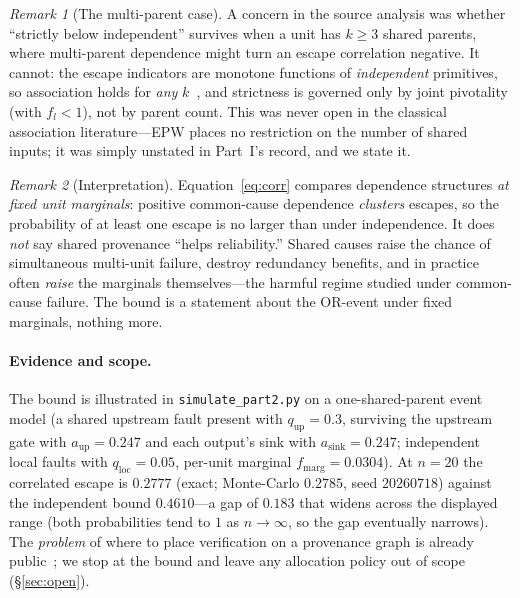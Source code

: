 \documentclass[11pt]{article}
\theoremstyle{definition}
\theoremstyle{remark}
\newtheorem{remark}{Remark}
\newcommand{\fesc}{f}
\begin{document}
\begin{remark}[The multi-parent case]
A concern in the source analysis was whether ``strictly below independent'' survives when a unit has
$k\ge3$ shared parents, where multi-parent dependence might turn an escape correlation negative.
It cannot: the escape indicators are monotone functions of \emph{independent} primitives, so
association holds for \emph{any} $k$~\cite{esary1967}, and strictness is governed only by joint
pivotality (with $\fesc_l<1$), not by parent count. This was never open in the classical association
literature---EPW places no restriction on the number of shared inputs; it was simply unstated in
Part~I's record, and we state it.
\end{remark}

\begin{remark}[Interpretation]\label{rem:interp}
Equation~\eqref{eq:corr} compares dependence structures \emph{at fixed unit marginals}: positive
common-cause dependence \emph{clusters} escapes, so the probability of at least one escape is no larger
than under independence. It does \emph{not} say shared provenance ``helps reliability.'' Shared causes
raise the chance of simultaneous multi-unit failure, destroy redundancy benefits, and in practice often
\emph{raise} the marginals themselves---the harmful regime studied under common-cause failure. The
bound is a statement about the OR-event under fixed marginals, nothing more.
\end{remark}

\paragraph{Evidence and scope.}
The bound is illustrated in \texttt{simulate\_part2.py} on a one-shared-parent event model (a shared
upstream fault present with $q_{\mathrm{up}}=0.3$, surviving the upstream gate with $a_{\mathrm{up}}=0.247$
and each output's sink with $a_{\mathrm{sink}}=0.247$; independent local faults with $q_{\mathrm{loc}}=0.05$,
per-unit marginal $\fesc_{\mathrm{marg}}=0.0304$). At $n=20$ the correlated escape is $0.2777$ (exact;
Monte-Carlo $0.2785$, seed $20260718$) against the independent bound $0.4610$---a gap of $0.183$ that
widens across the displayed range (both probabilities tend to $1$ as $n\to\infty$, so the gap
eventually narrows). The \emph{problem} of where to place verification on a provenance graph is already
public~\cite{ro2025sherlock}; we stop at the bound and leave any allocation policy out of scope
(\S\ref{sec:open}).
\end{document}
